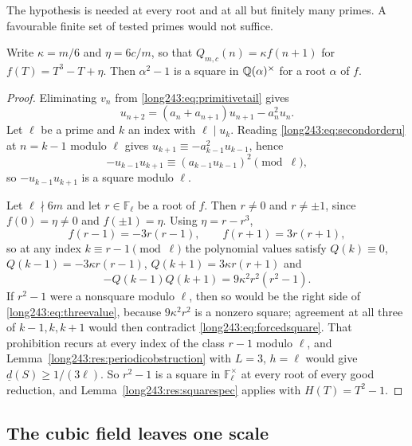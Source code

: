\documentclass[11pt]{article}
\newcommand{\Fp}{\mathbb{F}}
\begin{document}
The hypothesis is needed at every root and at all but finitely many primes.  A
favourable finite set of tested primes would not suffice.

\begin{proposition}\label{long243:res:transportsquare}
Write $\kappa=m/6$ and $\eta=6c/m$, so that $Q_{m,c}(n)=\kappa f(n+1)$ for
$f(T)=T^3-T+\eta$.  Then $\alpha^2-1$ is a square in $\mathbb{Q}(\alpha)^\times$ for a
root $\alpha$ of $f$.
\end{proposition}

\begin{proof}
Eliminating $v_n$ from \eqref{long243:eq:primitivetail} gives
\begin{equation}\label{long243:eq:secondorderu}
 u_{n+2}=(a_n+a_{n+1})u_{n+1}-a_n^2u_n .
\end{equation}
Let $\ell$ be a prime and $k$ an index with $\ell\mid u_k$.  Reading
\eqref{long243:eq:secondorderu} at $n=k-1$ modulo $\ell$ gives
$u_{k+1}\equiv-a_{k-1}^2u_{k-1}$, hence
\begin{equation}\label{long243:eq:forcedsquare}
 -u_{k-1}u_{k+1}\equiv(a_{k-1}u_{k-1})^2 \pmod\ell,
\end{equation}
so $-u_{k-1}u_{k+1}$ is a square modulo $\ell$.

Let $\ell\nmid6m$ and let $r\in\Fp_\ell$ be a root of $f$.  Then $r\ne0$ and
$r\ne\pm1$, since $f(0)=\eta\ne0$ and $f(\pm1)=\eta$.  Using $\eta=r-r^3$,
\[
 f(r-1)=-3r(r-1),\qquad f(r+1)=3r(r+1),
\]
so at any index $k\equiv r-1\pmod\ell$ the polynomial values satisfy
$Q(k)\equiv0$, $Q(k-1)=-3\kappa r(r-1)$, $Q(k+1)=3\kappa r(r+1)$ and
\begin{equation}\label{long243:eq:threevalue}
 -Q(k-1)Q(k+1)=9\kappa^2r^2(r^2-1).
\end{equation}
If $r^2-1$ were a nonsquare modulo $\ell$, then so would be the right side of
\eqref{long243:eq:threevalue}, because $9\kappa^2r^2$ is a nonzero square; agreement at
all three of $k-1,k,k+1$ would then contradict \eqref{long243:eq:forcedsquare}.  That
prohibition recurs at every index of the class $r-1$ modulo $\ell$, and
Lemma~\ref{long243:res:periodicobstruction} with $L=3$, $h=\ell$ would give
$\underline d(S)\ge1/(3\ell)$.  So $r^2-1$ is a square in $\Fp_\ell^\times$ at
every root of every good reduction, and Lemma~\ref{long243:res:squarespec} applies with
$H(T)=T^2-1$.
\end{proof}

\subsection{The cubic field leaves one scale}
\end{document}
